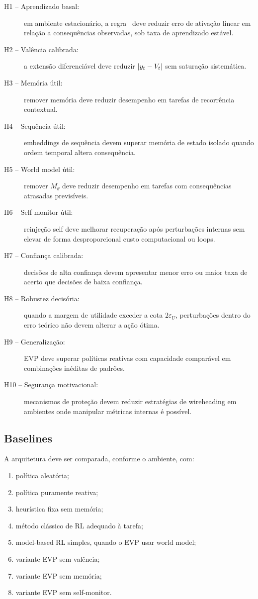 \begin{description}
\item[H1 -- Aprendizado basal:] em ambiente estacionário, a regra \EVPB\ deve reduzir erro de ativação linear em relação a consequências observadas, sob taxa de aprendizado estável.
\item[H2 -- Valência calibrada:] a extensão diferenciável deve reduzir \(\left\lvert y_t-V_t \right\rvert\) sem saturação sistemática.
\item[H3 -- Memória útil:] remover memória deve reduzir desempenho em tarefas de recorrência contextual.
\item[H4 -- Sequência útil:] embeddings de sequência devem superar memória de estado isolado quando ordem temporal altera consequência.
\item[H5 -- World model útil:] remover \(M_\theta\) deve reduzir desempenho em tarefas com consequências atrasadas previsíveis.
\item[H6 -- Self-monitor útil:] reinjeção self deve melhorar recuperação após perturbações internas sem elevar de forma desproporcional custo computacional ou loops.
\item[H7 -- Confiança calibrada:] decisões de alta confiança devem apresentar menor erro ou maior taxa de acerto que decisões de baixa confiança.
\item[H8 -- Robustez decisória:] quando a margem de utilidade exceder a cota \(2\varepsilon_U\), perturbações dentro do erro teórico não devem alterar a ação ótima.
\item[H9 -- Generalização:] EVP deve superar políticas reativas com capacidade comparável em combinações inéditas de padrões.
\item[H10 -- Segurança motivacional:] mecanismos de proteção devem reduzir estratégias de wireheading em ambientes onde manipular métricas internas é possível.
\end{description}

\subsection{Baselines}

A arquitetura deve ser comparada, conforme o ambiente, com:
\begin{enumerate}
\item política aleatória;
\item política puramente reativa;
\item heurística fixa sem memória;
\item método clássico de RL adequado à tarefa;
\item model-based RL simples, quando o EVP usar world model;
\item variante EVP sem valência;
\item variante EVP sem memória;
\item variante EVP sem self-monitor.
\end{enumerate}

